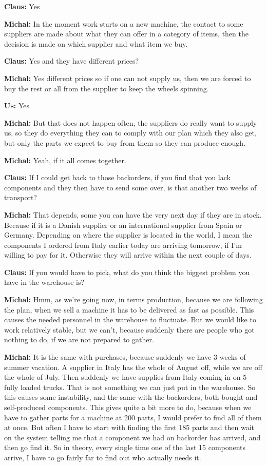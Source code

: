 \textbf{Claus:} Yes \nl

\textbf{Michal:} In the moment work starts on a new machine, the contact to
some suppliers are made about what they can offer in a category of items, then
the decision is made on which supplier and what item we buy.\nl

\textbf{Claus:} Yes and they have different prices?\nl

\textbf{Michal:} Yes different prices so if one can not supply us, then we are
forced to buy the rest or all from the supplier to keep the wheels spinning. \nl

\textbf{Us:} Yes \nl

\textbf{Michal:} But that does not happen often, the suppliers do really want
to supply us, so they do everything they can to comply with our plan
which they also get, but only the parts we expect to buy from them so they can
produce enough.\nl


\textbf{Michal:} Yeah, if it all comes together.\nl

\textbf{Claus:} If I could get back to those backorders, if you find that you
lack components and they then have to send some over, is that another two weeks
of transport?\nl

\textbf{Michal:} That depends, some you can have the very next day if they are
in stock. Because if it is a Danish supplier or an international supplier from
Spain or Germany. Depending on where the supplier is located in the world, I
mean the components I ordered from Italy earlier today are arriving tomorrow, if I'm
willing to pay for it. Otherwise they will arrive within the next couple of
days.\nl

\textbf{Claus:} If you would have to pick, what do you think the biggest problem
you have in the warehouse is?\nl

\textbf{Michal:} Hmm, as we're going now, in terms production, because we are
following the plan, when we sell a machine it has to be delivered as fast as
possible. This causes the needed personnel in the warehouse to fluctuate. But we
would like to work relatively stable, but we can't, because suddenly there are
people who got nothing to do, if we are not prepared to gather.\nl

\textbf{Michal:} It is the same with purchases, because suddenly we have 3 weeks
of summer vacation. A supplier in Italy has the whole of August off, while we
are off the whole of July.  Then suddenly we have supplies from Italy coming in
on 5 fully loaded trucks. That is not something we can just put in the
warehouse.
So this causes some instability, and the same with the backorders, both bought and
self-produced components. This gives quite a bit more to do, because when we
have to gather parts for a machine at 200 parts, I would prefer to find all of
them at once. But often I have to start with finding the first 185 parts and then
wait on the system telling me that a component we had on backorder has arrived,
and then go find it.  So in theory, every single time one of the last 15
components arrive, I have to go fairly far to find out who actually needs it.\nl

